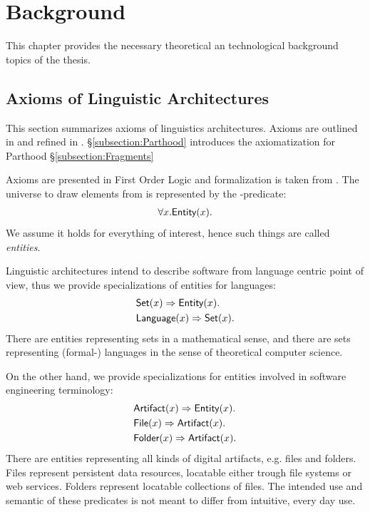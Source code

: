 \chapter{Background}
\label{chapter:Background}
This chapter provides the necessary theoretical an technological background topics of the thesis.

\section{Axioms of Linguistic Architectures}
\label{section:AxiomsOfLinguisticArchitectures}
This section summarizes axioms of linguistics architectures.
Axioms are outlined in \cite{DBLP:conf/sle/Lammel16} and refined in \cite{HeinzLV17}.
§\ref{subsection:Parthood} introduces the axiomatization for \gls{Parthood}
§\ref{subsection:Fragments} 

Axioms are presented in First Order Logic and formalization is taken from \cite{HeinzLV17}.
The universe to draw elements from is represented by the \Entity-predicate:
\begin{align*}
\forall x.\textsf{Entity}(x).
\end{align*}
We assume it holds for everything of interest, hence such things are called \textit{entities}.

Linguistic architectures intend to describe software from language centric point of view, thus we provide specializations of entities for languages:
\begin{align*}
&\textsf{Set}(x) \Rightarrow \textsf{Entity}(x).\\
&\textsf{Language}(x) \Rightarrow \textsf{Set}(x).
\end{align*}
There are entities representing sets in a mathematical sense, and there are sets representing (formal-) languages in the sense of theoretical computer science.

On the other hand, we provide specializations for entities involved in software engineering terminology:
\begin{align*}
&\textsf{Artifact}(x) \Rightarrow \textsf{Entity}(x).\\
&\textsf{File}(x) \Rightarrow \textsf{Artifact}(x).\\
&\textsf{Folder}(x) \Rightarrow \textsf{Artifact}(x).
\end{align*}
There are entities representing all kinds of digital artifacts, e.g. files and folders.
Files represent persistent data resources, locatable either trough file systems or web services.
Folders represent locatable collections of files.
The intended use and semantic of these predicates is not meant to differ from intuitive, every day use.


